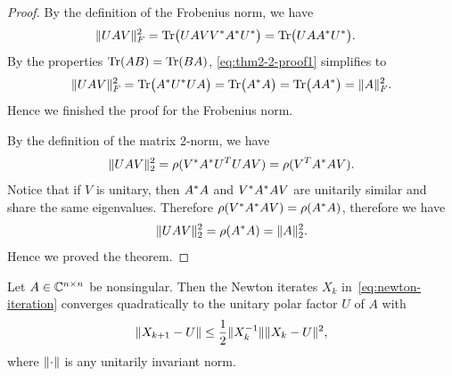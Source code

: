 \documentclass[12pt]{article}
\begin{document}
\begin{proof}
By the definition of the Frobenius norm, we have 
\begin{equation}
    \label{eq:thm2-2-proof1}
    \begin{aligned}
        \|UAV\|_F^2 &= \mathrm{Tr}\big(U AVV^* A^* U^* \big) = \mathrm{Tr}\big( U AA^* U^*\big).
    \end{aligned}
\end{equation}
By the properties $\mathrm{Tr}(AB) = \mathrm{Tr}(BA)$, \eqref{eq:thm2-2-proof1} simplifies to 
\begin{equation}
    \label{eq:thm2-2-proof2}
    \|U AV\|_F^2 = \mathrm{Tr}\big(A^* U^* U A\big) = \mathrm{Tr}\big(A^* A\big) = \mathrm{Tr}\big(AA^*\big) = \|A\|_F^2.
\end{equation}
Hence we finished the proof for the Frobenius norm.

By the definition of the matrix 2-norm, we have 
\begin{equation}\notag
    \|{UAV}\|_2^2 = \rho(V^* A^* U^T UAV) = \rho({V^T A^* AV}).
\end{equation}
Notice that if $V$ is unitary, then $A^* A$ and $V^* A^* A V$ are unitarily similar and share the same eigenvalues. Therefore $\rho(V^* A^* AV) = \rho (A^* A)$, therefore we have 
\begin{equation}\notag
    \|{UAV}\|_2^2 = \rho(A^* A) = \|{A}\|_2^2.
\end{equation}
Hence we proved the theorem.
\end{proof}

\begin{theorem}
     \label{thm:newton-converge}
    Let $A\in\mathbb{C}^{n\times n}$ be nonsingular. Then the Newton iterates $X_k$ in~\eqref{eq:newton-iteration} converges quadratically to the unitary polar factor $U$ of $A$ with 
    \begin{equation}\notag
        \|{X_{k+1} - U}\| \leq \frac 12 \|{X_k^{-1}}\|\|{X_k - U}\|^2,
    \end{equation}
    where $\|{\cdot}\|$ is any unitarily invariant norm.
\end{theorem}
\end{document}

